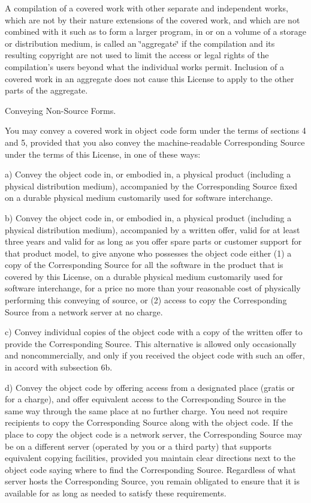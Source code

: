 A compilation of a covered work with other separate and independent works, which are not by their nature extensions of the covered work, and which are not combined with it such as to form a larger program, in or on a volume of a storage or distribution medium, is called an \char`\"{}aggregate\char`\"{} if the compilation and its resulting copyright are not used to limit the access or legal rights of the compilation's users beyond what the individual works permit. Inclusion of a covered work in an aggregate does not cause this License to apply to the other parts of the aggregate.


\begin{DoxyEnumerate}
\item Conveying Non-\/\-Source Forms.
\end{DoxyEnumerate}

You may convey a covered work in object code form under the terms of sections 4 and 5, provided that you also convey the machine-\/readable Corresponding Source under the terms of this License, in one of these ways\-:

a) Convey the object code in, or embodied in, a physical product (including a physical distribution medium), accompanied by the Corresponding Source fixed on a durable physical medium customarily used for software interchange.

b) Convey the object code in, or embodied in, a physical product (including a physical distribution medium), accompanied by a written offer, valid for at least three years and valid for as long as you offer spare parts or customer support for that product model, to give anyone who possesses the object code either (1) a copy of the Corresponding Source for all the software in the product that is covered by this License, on a durable physical medium customarily used for software interchange, for a price no more than your reasonable cost of physically performing this conveying of source, or (2) access to copy the Corresponding Source from a network server at no charge.

c) Convey individual copies of the object code with a copy of the written offer to provide the Corresponding Source. This alternative is allowed only occasionally and noncommercially, and only if you received the object code with such an offer, in accord with subsection 6b.

d) Convey the object code by offering access from a designated place (gratis or for a charge), and offer equivalent access to the Corresponding Source in the same way through the same place at no further charge. You need not require recipients to copy the Corresponding Source along with the object code. If the place to copy the object code is a network server, the Corresponding Source may be on a different server (operated by you or a third party) that supports equivalent copying facilities, provided you maintain clear directions next to the object code saying where to find the Corresponding Source. Regardless of what server hosts the Corresponding Source, you remain obligated to ensure that it is available for as long as needed to satisfy these requirements.

